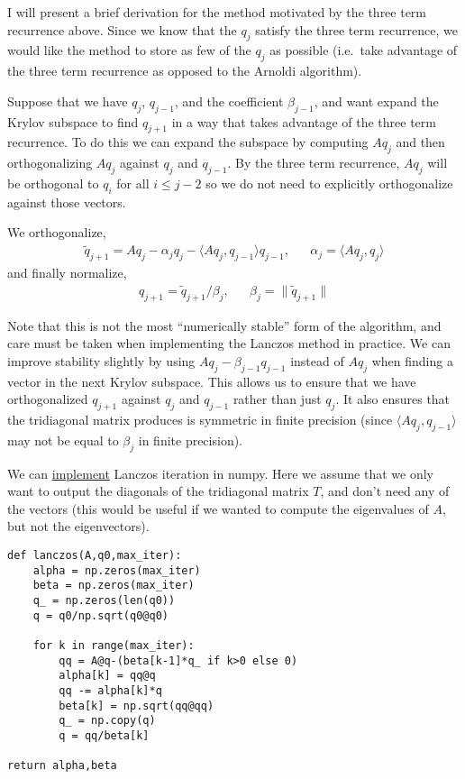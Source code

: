 I will present a brief derivation for the method motivated by the three
term recurrence above. Since we know that the \(q_j\) satisfy the three
term recurrence, we would like the method to store as few of the \(q_j\)
as possible (i.e.~take advantage of the three term recurrence as opposed
to the Arnoldi algorithm).

Suppose that we have \(q_j\), \(q_{j-1}\), and the coefficient
\(\beta_{j-1}\), and want expand the Krylov subspace to find \(q_{j+1}\)
in a way that takes advantage of the three term recurrence. To do this
we can expand the subspace by computing \(Aq_j\) and then
orthogonalizing \(Aq_j\) against \(q_j\) and \(q_{j-1}\). By the three
term recurrence, \(Aq_j\) will be orthogonal to \(q_i\) for all
\(i\leq j-2\) so we do not need to explicitly orthogonalize against
those vectors.

We orthogonalize, \begin{align*}
\tilde{q}_{j+1} = Aq_j - \alpha_j q_j - \langle Aq_j, q_{j-1} \rangle q_{j-1}
, && 
\alpha_{j} = \langle A q_j, q_j \rangle
\end{align*} and finally normalize, \begin{align*}
q_{j+1} = \tilde{q}_{j+1} / \beta_j
,&&
\beta_j = \|\tilde{q}_{j+1}\|
\end{align*}

Note that this is not the most ``numerically stable'' form of the
algorithm, and care must be taken when implementing the Lanczos method
in practice. We can improve stability slightly by using
\(Aq_j - \beta_{j-1} q_{j-1}\) instead of \(Aq_j\) when finding a vector
in the next Krylov subspace. This allows us to ensure that we have
orthogonalized \(q_{j+1}\) against \(q_j\) and \(q_{j-1}\) rather than
just \(q_j\). It also ensures that the tridiagonal matrix produces is
symmetric in finite precision (since \(\langle Aq_j,q_{j-1}\rangle\) may
not be equal to \(\beta_j\) in finite precision).

We can \href{./lanczos.py}{implement} Lanczos iteration in numpy. Here
we assume that we only want to output the diagonals of the tridiagonal
matrix \(T\), and don't need any of the vectors (this would be useful if
we wanted to compute the eigenvalues of \(A\), but not the
eigenvectors).

\begin{verbatim}
def lanczos(A,q0,max_iter):
    alpha = np.zeros(max_iter)
    beta = np.zeros(max_iter)
    q_ = np.zeros(len(q0))
    q = q0/np.sqrt(q0@q0)

    for k in range(max_iter):
        qq = A@q-(beta[k-1]*q_ if k>0 else 0)
        alpha[k] = qq@q
        qq -= alpha[k]*q
        beta[k] = np.sqrt(qq@qq)
        q_ = np.copy(q)
        q = qq/beta[k]

return alpha,beta
\end{verbatim}

